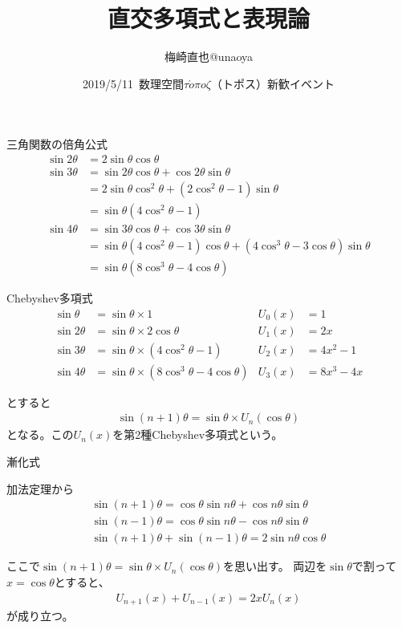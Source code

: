 \documentclass[dvipdfmx]{beamer}
\title{直交多項式と表現論}
\author{梅崎直也@unaoya}
\date{2019/5/11~数理空間$\tau\acute{o}\pi o\zeta$（トポス）新歓イベント}
\begin{document}
\begin{frame}
\maketitle
\end{frame}

\begin{frame}{三角関数の倍角公式}
\begin{align*}
\sin2\theta&=2\sin\theta\cos\theta\\
\sin3\theta&=\sin2\theta\cos\theta+\cos2\theta\sin\theta\\
&=2\sin\theta\cos^2\theta+(2\cos^2\theta-1)\sin\theta\\
&=\sin\theta(4\cos^2\theta-1)\\
\sin4\theta&=\sin3\theta\cos\theta+\cos3\theta\sin\theta\\
&=\sin\theta(4\cos^2\theta-1)\cos\theta+(4\cos^3\theta-3\cos\theta)\sin\theta\\
&=\sin\theta(8\cos^3\theta-4\cos\theta)
\end{align*}
\end{frame}

\begin{frame}{Chebyshev多項式}
\begin{align*}
\sin\theta&=\sin\theta\times1&U_0(x)&=1\\
\sin2\theta&=\sin\theta\times2\cos\theta&U_1(x)&=2x\\
\sin3\theta&=\sin\theta\times(4\cos^2\theta-1)&U_2(x)&=4x^2-1\\
\sin4\theta&=\sin\theta\times(8\cos^3\theta-4\cos\theta)&U_3(x)&=8x^3-4x
\end{align*}

とすると
\begin{align*}
\sin(n+1)\theta=\sin\theta\times U_n(\cos\theta)
\end{align*}
となる。この$U_n(x)$を第2種Chebyshev多項式という。
\end{frame}

\begin{frame}{漸化式}

加法定理から
\begin{align*}
\sin(n+1)\theta=\cos\theta\sin n\theta+\cos n\theta\sin\theta\\
\sin(n-1)\theta=\cos\theta\sin n\theta-\cos n\theta\sin\theta\\
\sin(n+1)\theta+\sin(n-1)\theta=2\sin n\theta\cos\theta
\end{align*}

ここで$\sin(n+1)\theta=\sin\theta\times U_n(\cos\theta)$を思い出す。
両辺を$\sin\theta$で割って$x=\cos\theta$とすると、
\begin{align*}
U_{n+1}(x)+U_{n-1}(x)=2xU_n(x)
\end{align*}
が成り立つ。
\end{frame}
\end{document}
